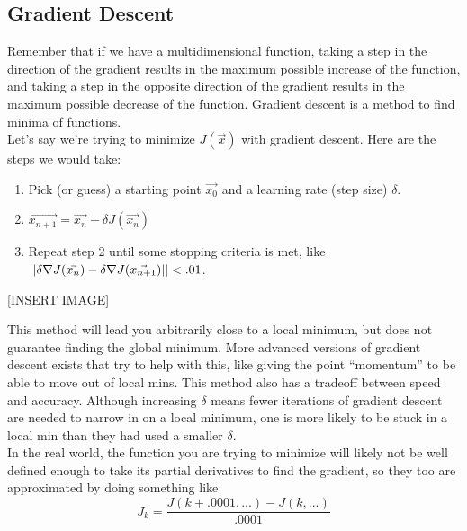 \subsection{Gradient Descent}
\noindent
Remember that if we have a multidimensional function, taking a step in the direction of the gradient results in the maximum possible increase of the function, and taking a step in the opposite direction of the gradient results in the maximum possible decrease of the function. Gradient descent is a method to find minima of functions.\\

\noindent
Let's say we're trying to minimize $J(\vec{x})$ with gradient descent. Here are the steps we would take:
\begin{enumerate}
	\item Pick (or guess) a starting point $\vec{x_0}$ and a learning rate (step size) $\delta$.
	\item $\vec{x_{n+1}}=\vec{x_n}-\delta J(\vec{x_n})$
	\item Repeat step 2 until some stopping criteria is met, like $\left|\left|\delta\nabla J(\vec{x_n})-\delta\nabla J(\vec{x_{n+1}})\right|\right|<.01$.
\end{enumerate}

[INSERT IMAGE]

\noindent
This method will lead you arbitrarily close to a local minimum, but does not guarantee finding the global minimum. More advanced versions of gradient descent exists that try to help with this, like giving the point “momentum” to be able to move out of local mins.
This method also has a tradeoff between speed and accuracy. Although increasing $\delta$ means fewer iterations of gradient descent are needed to narrow in on a local minimum, one is more likely to be stuck in a local min than they had used a smaller $\delta$.\\

\noindent
In the real world, the function you are trying to minimize will likely not be well defined enough to take its partial derivatives to find the gradient, so they too are approximated by doing something like $$J_{k}=\frac{J(k+.0001,...)-J(k,...)}{.0001}$$